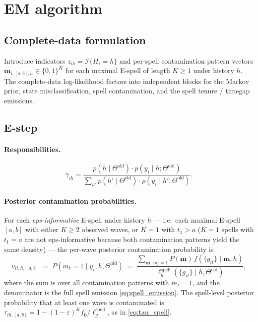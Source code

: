 \documentclass[12pt]{article}
\begin{document}
\section{EM algorithm}

\subsection{Complete-data formulation}

Introduce indicators \(z_{ih} = \mathcal{I}\{H_i = h\}\) and per-spell
contamination pattern vectors \(\mathbf{m}_{i,[a,b],h} \in \{0,1\}^K\) for
each maximal E-spell of length \(K \ge 1\) under history \(h\).
The complete-data log-likelihood factors into independent blocks for
the Markov prior, state misclassification, spell contamination, and the
spell tenure / timegap emissions.

\subsection{E-step}

\paragraph{Responsibilities.}
\begin{equation}
\gamma_{ih} = \frac{p(h \mid \Theta^{\mathrm{old}}) \cdot p(y_i \mid h; \Theta^{\mathrm{old}})}{\sum_{h'} p(h' \mid \Theta^{\mathrm{old}}) \cdot p(y_i \mid h'; \Theta^{\mathrm{old}})}.
\end{equation}

\paragraph{Posterior contamination probabilities.}
For each \emph{eps-informative} E-spell under history \(h\) --- i.e.\ each
maximal E-spell \([a,b]\) with either \(K \ge 2\) observed waves, or
\(K = 1\) with \(t_1 > a\) (\(K=1\) spells with \(t_1 = a\) are not
eps-informative because both contamination patterns yield the same density)
--- the per-wave posterior contamination probability is
\begin{equation}
\nu_{it,h,[a,b]} \;=\; P(m_t = 1 \mid y_i, h, \Theta^{\mathrm{old}})
\;=\;
\frac{\sum_{\mathbf{m}:\, m_t = 1}\!
P(\mathbf{m})\, f(\{g_{it}\} \mid \mathbf{m}, h)}
{\ell^{\mathrm{spell}}_g(\{g_{it}\} \mid h, \Theta^{\mathrm{old}})},
\end{equation}
where the sum is over all contamination patterns with \(m_t = 1\), and
the denominator is the full spell emission \eqref{eq:spell_emission}.
The spell-level posterior probability that at least one wave is
contaminated is
\(\tau_{ih,[a,b]} = 1 - (1-\varepsilon)^K f_{\mathbf{0}} /
\ell^{\mathrm{spell}}_g\),
as in \eqref{eq:tau_spell}.
\end{document}
